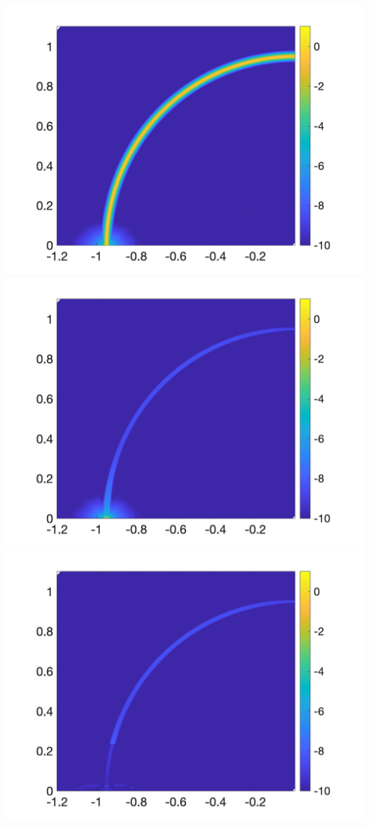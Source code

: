 \includegraphics[trim=40 20 40 10, clip, width=2.5truein]{figs/fig400a3} 
\includegraphics[trim=40 20 40 10, clip, width=2.5truein]{figs/fig400b3} 
\includegraphics[trim=40 20 40 10, clip, width=2.5truein]{figs/fig400c3}\\
